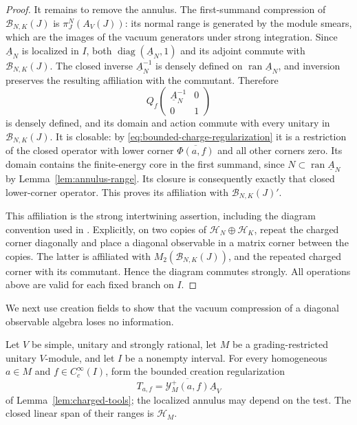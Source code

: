 \begin{proof}
It remains to remove the annulus.  The first-summand compression of
$\mathcal B_{N,K}(J)$ is $\pi_J^N(A_V(J))$: its normal range is
generated by the module smears, which are the images of the vacuum
generators under strong integration.  Since $\underline A_N$ is
localized in $I$, both $\operatorname{diag}(\underline A_N,1)$ and
its adjoint commute with $\mathcal B_{N,K}(J)$.  The closed inverse
$\underline A_N^{-1}$ is densely defined on
$\operatorname{ran}\underline A_N$, and inversion preserves the
resulting affiliation with the commutant.  Therefore
\[
 Q_f\begin{pmatrix}\underline A_N^{-1}&0\\0&1\end{pmatrix}
\]
is densely defined, and its domain and action commute with every
unitary in $\mathcal B_{N,K}(J)$.  It is closable: by
\eqref{eq:bounded-charge-regularization} it is a restriction of the
closed operator with lower corner $\overline{\Phi(a,f)}$ and all other
corners zero.  Its domain contains the finite-energy core in the first
summand, since $N\subset\operatorname{ran}\underline A_N$ by
Lemma~\ref{lem:annulus-range}.  Its closure is consequently exactly
that closed lower-corner operator.  This proves its affiliation with
$\mathcal B_{N,K}(J)'$.

This affiliation is the strong intertwining assertion, including the
diagram convention used in \cite[Section~3.3]{GuiUnbounded}.
Explicitly, on two copies of $\mathcal H_N\oplus\mathcal H_K$, repeat
the charged corner diagonally and place a diagonal observable in a
matrix corner between the copies.  The latter is affiliated with
$M_2(\mathcal B_{N,K}(J))$, and the repeated charged corner with its
commutant.  Hence the diagram commutes strongly.  All operations above
are valid for each fixed branch on $I$.
\end{proof}

We next use creation fields to show that the vacuum compression of a
diagonal observable algebra loses no information.

\begin{lemma}
\label{lem:creation-totality}
Let $V$ be simple, unitary and strongly rational, let $M$ be a
grading-restricted unitary $V$-module, and let $I$ be a nonempty
interval.  For every homogeneous $a\in M$ and
$f\in C_c^\infty(I)$, form the bounded creation regularization
\[
 T_{a,f}=\overline{\mathcal Y_M^+(a,f)}\underline A_V
\]
of Lemma~\ref{lem:charged-tools}; the localized annulus may depend on
the test.  The closed linear span of their ranges is $\mathcal H_M$.
\end{lemma}

